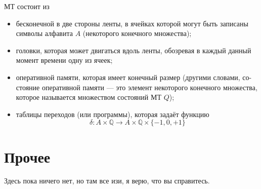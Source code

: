 \documentclass{article}
\newcommand{\Q}{\mathbb{Q}}
\newenvironment{definition}[2][Определение]{\begin{trivlist}
\item[\hskip \labelsep {\bfseries #1}\hskip \labelsep {\bfseries #2}]}{\end{trivlist}}
\begin{document}
\begin{definition}{МТ}
МТ состоит из
\begin{itemize}
\item бесконечной в две стороны ленты, в ячейках которой могут быть записаны
символы алфавита $A$ (некоторого конечного множества);
\item головки, которая может двигаться вдоль ленты, обозревая в каждый данный
момент времени одну из ячеек;
\item оперативной памяти, которая имеет конечный размер (другими словами, со-
стояние оперативной памяти — это элемент некоторого конечного множества,
которое называется множеством состояний МТ $Q$);
\item таблицы переходов (или программы), которая задаёт функцию
\[
\delta : A \times \Q \to A \times \Q \times \{-1, 0, +1\}
\]
\end{itemize}
\end{definition}

\section{Прочее}
Здесь пока ничего нет, но там все изи, я верю, что вы справитесь.
\end{document}
